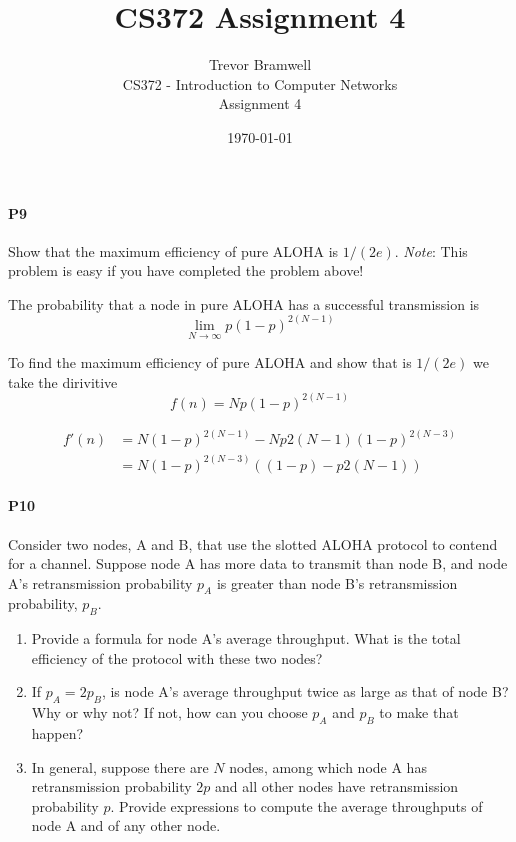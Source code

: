 \documentclass[12pt,letterpaper]{article}
\title{CS372 Assignment 4}
\author{
    Trevor Bramwell \\
    CS372 - Introduction to Computer Networks \\
    Assignment 4
}
\date{\today}
\begin{document}
\maketitle

% 
%
%
%
%
%
\paragraph{P9} Show that the maximum efficiency of pure ALOHA is $1/(2e)$.
\emph{Note}: This problem is easy if you have completed the problem above!

The probability that a node in pure ALOHA has a successful transmission is
\[
\lim_{N \to \infty} p(1-p)^{2(N-1)}
\]

To find the maximum efficiency of pure ALOHA and show that is $1/(2e)$ we take
the dirivitive
\[
f(n) = Np(1-p)^{2(N-1)}
\]

\begin{align*}
f'(n) &= N(1-p)^{2(N-1)}-Np2(N-1)(1-p)^{2(N-3)} \\
&= N(1-p)^{2(N-3)}((1-p)-p2(N-1))
\end{align*}

\paragraph{P10} Consider two nodes, A and B, that use the slotted ALOHA 
protocol to contend for a channel. Suppose node A has more data to transmit 
than node B, and node A's retransmission probability $p_{A}$ is greater
than node B's retransmission probability, $p_{B}$.
\begin{enumerate}
\item Provide a formula for node A's average throughput. What is the total
    efficiency of the protocol with these two nodes?
\item If $p_{A} = 2p_{B}$, is node A's average throughput twice as large
    as that of node B? Why or why not? If not, how can you choose $p_{A}$ and 
$p_{B}$ to make that happen?
\item In general, suppose there are $N$ nodes, among which node A has
    retransmission probability $2p$ and all other nodes have retransmission
    probability $p$. Provide expressions to compute the average throughputs of
    node A and of any other node.
\end{enumerate}
\end{document}
